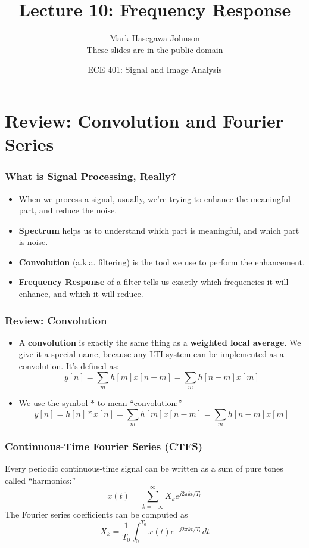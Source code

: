 \documentclass{beamer}
\title{Lecture 10: Frequency Response}
\author{Mark Hasegawa-Johnson\\These slides are in the public domain}
\date{ECE 401: Signal and Image Analysis}
\begin{document}
\begin{frame}
  \maketitle
\end{frame}

\begin{frame}
  \tableofcontents
\end{frame}

\section[Review]{Review: Convolution and Fourier Series}
\setcounter{subsection}{1}

\begin{frame}
  \frametitle{What is Signal Processing, Really?}

  \begin{itemize}
  \item When we process a signal, usually, we're trying to
    enhance the meaningful part, and reduce the noise.
  \item {\bf Spectrum} helps us  to understand which part is
    meaningful, and which part is noise.
  \item {\bf Convolution} (a.k.a. filtering) is the tool we use to
    perform the enhancement.
  \item {\bf Frequency Response} of a filter tells us exactly which
    frequencies it will enhance, and which it will reduce.
  \end{itemize}
\end{frame}

\begin{frame}
  \frametitle{Review: Convolution}
  \begin{itemize}
  \item A {\bf convolution} is exactly the same thing as a {\bf
    weighted local average}.  We give it a special name, because any
    LTI system can be implemented as a convolution.  It's defined as:
    \[
    y[n] = \sum_m h[m] x[n-m] = \sum_m h[n-m] x[m]
    \]
  \item 
    We use the symbol $\ast$ to mean ``convolution:''
    \[
    y[n]=h[n]\ast x[n] = \sum_m h[m] x[n-m] = \sum_m h[n-m] x[m]
    \]
  \end{itemize}
\end{frame}

\begin{frame}
  \frametitle{Continuous-Time Fourier Series (CTFS)}

  Every periodic continuous-time signal can be written as a
  sum of pure tones called ``harmonics:''
  \[
  x(t) = \sum_{k=-\infty}^\infty X_k e^{j2\pi kt/T_0}
  \]
  The Fourier series coefficients can be computed as
  \[
  X_k = \frac{1}{T_0}\int_0^{T_0} x(t)e^{-j2\pi kt/T_0}dt
  \]
\end{frame}  
        
\end{document}
